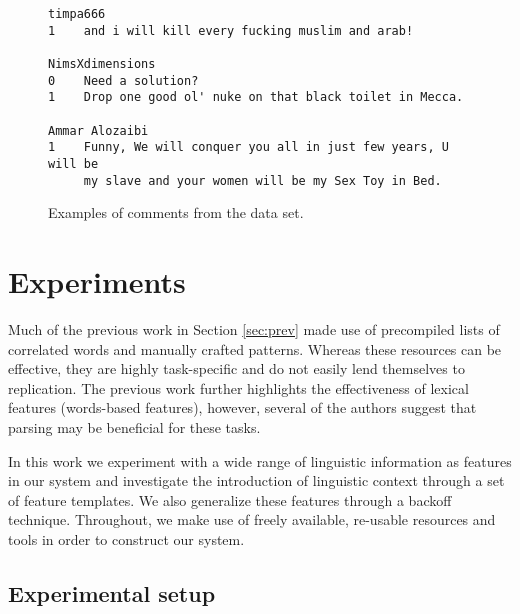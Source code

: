 \documentclass[11pt,letterpaper]{article}
\begin{document}
\begin{figure*}
\begin{verbatim}
timpa666
1    and i will kill every fucking muslim and arab!

NimsXdimensions
0    Need a solution?
1    Drop one good ol' nuke on that black toilet in Mecca.

Ammar Alozaibi
1    Funny, We will conquer you all in just few years, U will be
     my slave and your women will be my Sex Toy in Bed.

\end{verbatim}
\caption{Examples of comments from the data set.}
\label{fig:comments}
\end{figure*}

\section{Experiments}
\label{sec:exp}
Much of the previous work in Section \ref{sec:prev} made use of
precompiled lists of correlated words and manually crafted
patterns. Whereas these resources can be effective, they are highly
task-specific and do not easily lend themselves to replication.  The
previous work further highlights the effectiveness of lexical features
(words-based features), however, several of the authors suggest that parsing
may be beneficial for these tasks.

In this work we experiment with a wide range of linguistic information
as features in our system and investigate the introduction of
linguistic context through a set of feature templates. We also
generalize these features through a backoff technique. Throughout, we
make use of freely available, re-usable resources and tools in order
to construct our system.


\subsection{Experimental setup}
\end{document}
